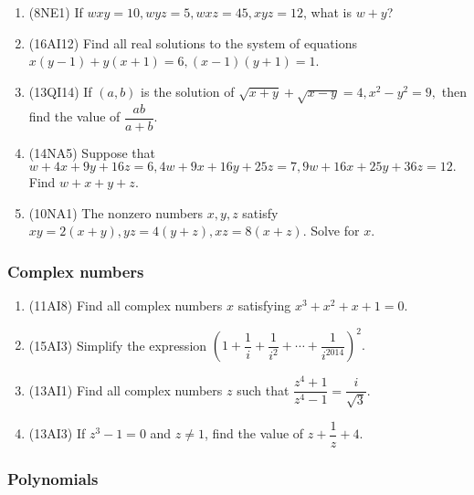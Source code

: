 \documentclass[10pt,paper=letter]{scrartcl}
\begin{document}
\begin{enumerate}

\item (8NE1) If $wxy = 10, wyz = 5, wxz = 45, xyz = 12$, what is $w + y$?

\item (16AI12) Find all real solutions to the system of equations $x(y-1) + y(x+1) = 6, (x-1)(y+1) = 1$.

\item (13QI14) If $(a, b)$ is the solution of $\sqrt{x+y} + \sqrt{x-y} = 4, x^2-y^2=9,$ then find the value of $\dfrac{ab}{a+b}$.

\item (14NA5) Suppose that $w+4x+9y+16z = 6, 4w+9x+16y+25z=7, 9w+16x+25y+36z=12.$ Find $w+x+y+z$.

\item (10NA1) The nonzero numbers $x, y, z$ satisfy $xy = 2(x+y), yz = 4(y+z), xz = 8(x+z)$. Solve for $x$.

\end{enumerate}

\subsubsection*{Complex numbers}

\begin{enumerate}

\item (11AI8) Find all complex numbers $x$ satisfying $x^3 + x^2 + x + 1 = 0$.

\item (15AI3) Simplify the expression $\left(1 + \dfrac{1}{i} + \dfrac{1}{i^2} + \cdots + \dfrac{1}{i^{2014}}\right)^2.$

\item (13AI1) Find all complex numbers $z$ such that $\dfrac{z^4+1}{z^4-1} = \dfrac{i}{\sqrt{3}}.$

\item (13AI3) If $z^3 - 1 = 0$ and $z \neq 1$, find the value of $z + \dfrac{1}{z} + 4$.

\end{enumerate}

\subsubsection*{Polynomials}
\end{document}
